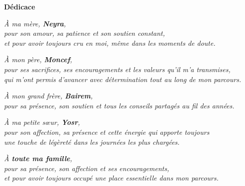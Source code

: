\thispagestyle{plain}

\begin{center}
\textbf{\Huge Dédicace}
\end{center}

\vspace{1.5cm}

\begin{center}
\textit{
À ma mère, \textbf{Neyra},\\
pour son amour, sa patience et son soutien constant,\\
et pour avoir toujours cru en moi, même dans les moments de doute.
}
\end{center}

\vspace{0.8cm}

\begin{center}
\textit{
À mon père, \textbf{Moncef},\\
pour ses sacrifices, ses encouragements et les valeurs qu'il m'a transmises,\\
qui m'ont permis d'avancer avec détermination tout au long de mon parcours.
}
\end{center}

\vspace{0.8cm}

\begin{center}
\textit{
À mon grand frère, \textbf{Bairem},\\
pour sa présence, son soutien et tous les conseils partagés au fil des années.
}
\end{center}

\vspace{0.8cm}

\begin{center}
\textit{
À ma petite sœur, \textbf{Yosr},\\
pour son affection, sa présence et cette énergie qui apporte toujours\\
une touche de légèreté dans les journées les plus chargées.
}
\end{center}

\vspace{0.8cm}

\begin{center}
\textit{
À \textbf{toute ma famille},\\
pour sa présence, son affection et ses encouragements,\\
et pour avoir toujours occupé une place essentielle dans mon parcours.
}
\end{center}

